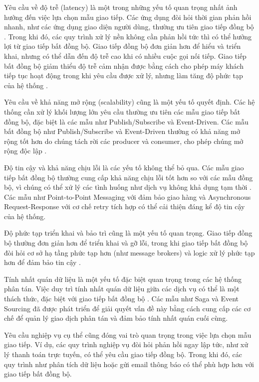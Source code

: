 Yêu cầu về độ trễ (latency) là một trong những yếu tố quan trọng nhất ảnh hưởng đến việc lựa chọn mẫu giao tiếp. Các ứng dụng đòi hỏi thời gian phản hồi nhanh, như các ứng dụng giao diện người dùng, thường ưu tiên giao tiếp đồng bộ \cite{richardson2019}. Trong khi đó, các quy trình xử lý nền không cần phản hồi tức thì có thể hưởng lợi từ giao tiếp bất đồng bộ. Giao tiếp đồng bộ đơn giản hơn để hiểu và triển khai, nhưng có thể dẫn đến độ trễ cao khi có nhiều cuộc gọi nối tiếp. Giao tiếp bất đồng bộ giảm thiểu độ trễ cảm nhận được bằng cách cho phép máy khách tiếp tục hoạt động trong khi yêu cầu được xử lý, nhưng làm tăng độ phức tạp của hệ thống \cite{newman2015}.

Yêu cầu về khả năng mở rộng (scalability) cũng là một yếu tố quyết định. Các hệ thống cần xử lý khối lượng lớn yêu cầu thường ưu tiên các mẫu giao tiếp bất đồng bộ, đặc biệt là các mẫu như Publish/Subscribe và Event-Driven. Các mẫu bất đồng bộ như Publish/Subscribe và Event-Driven thường có khả năng mở rộng tốt hơn do chúng tách rời các producer và consumer, cho phép chúng mở rộng độc lập \cite{aksakalli2021}.

Độ tin cậy và khả năng chịu lỗi là các yếu tố không thể bỏ qua. Các mẫu giao tiếp bất đồng bộ thường cung cấp khả năng chịu lỗi tốt hơn so với các mẫu đồng bộ, vì chúng có thể xử lý các tình huống như dịch vụ không khả dụng tạm thời \cite{fowler2014}. Các mẫu như Point-to-Point Messaging với đảm bảo giao hàng và Asynchronous Request-Response với cơ chế retry tích hợp có thể cải thiện đáng kể độ tin cậy của hệ thống.

Độ phức tạp triển khai và bảo trì cũng là một yếu tố quan trọng. Giao tiếp đồng bộ thường đơn giản hơn để triển khai và gỡ lỗi, trong khi giao tiếp bất đồng bộ đòi hỏi cơ sở hạ tầng phức tạp hơn (như message brokers) và logic xử lý phức tạp hơn để đảm bảo tin cậy \cite{newman2015}.

Tính nhất quán dữ liệu là một yếu tố đặc biệt quan trọng trong các hệ thống phân tán. Việc duy trì tính nhất quán dữ liệu giữa các dịch vụ có thể là một thách thức, đặc biệt với giao tiếp bất đồng bộ \cite{richardson2019}. Các mẫu như Saga và Event Sourcing đã được phát triển để giải quyết vấn đề này bằng cách cung cấp các cơ chế để quản lý giao dịch phân tán và đảm bảo tính nhất quán cuối cùng.

Yêu cầu nghiệp vụ cụ thể cũng đóng vai trò quan trọng trong việc lựa chọn mẫu giao tiếp. Ví dụ, các quy trình nghiệp vụ đòi hỏi phản hồi ngay lập tức, như xử lý thanh toán trực tuyến, có thể yêu cầu giao tiếp đồng bộ. Trong khi đó, các quy trình như phân tích dữ liệu hoặc gửi email thông báo có thể phù hợp hơn với giao tiếp bất đồng bộ.

